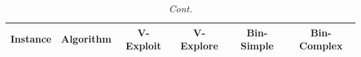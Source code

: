 \documentclass[mathematics,article,accept,moreauthors]{Definitions/mdpi}
\begin{document}
\begin{table}[H]\ContinuedFloat
\caption{\textit{Cont.}}
\label{tab:computational_cost_all_instances}

  \footnotesize
  \setlength{\tabcolsep}{4pt}

  \begin{tabularx}{\textwidth}{XLCCCC}

\toprule
\textbf{Instance} & \textbf{Algorithm} & \textbf{V-Exploit} & \textbf{V-Explore} & \textbf{Bin-Simple} & \textbf{Bin-Complex} \\
\midrule







\end{tabularx}
\end{table}
\end{document}
